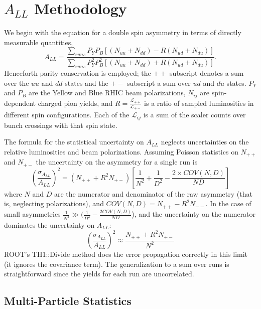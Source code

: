 \section{$A_{LL}$ Methodology}

We begin with the equation for a double spin asymmetry in terms of directly measurable quantities,
%
\begin{equation}
  A_{LL} = \frac{\sum_{runs} P_{Y}P_{B}\left[(N_{uu} + N_{dd}) - R(N_{ud} + N_{du})\right]}{\sum_{runs} P_{Y}^{2}P_{B}^{2}\left[(N_{uu} + N_{dd}) + R(N_{ud} + N_{du})\right]}.
  \label{eqn:all-basics}
\end{equation}
%
Henceforth parity conservation is employed; the \(++\) subscript denotes a sum
over the \(uu\) and \(dd\) states and the \(+-\) subscript a sum over \(ud\)
and \(du\) states. \(P_Y\) and \(P_B\) are the Yellow and Blue RHIC beam
polarizations, \(N_{ij}\) are spin-dependent charged pion yields, and \(R =
\frac{\mathcal{L}_{++}}{\mathcal{L}_{+-}}\) is a ratio of sampled luminosities
in different spin configurations. Each of the $\mathcal{L}_{ij}$ is a sum of
the scaler counts over bunch crossings with that spin state.

The formula for the statistical uncertainty on \(A_{LL}\) neglects
uncertainties on the relative luminosities and beam polarizations. Assuming
Poisson statistics on \(N_{++}\) and \(N_{+-}\) the uncertainty on the
asymmetry for a single run is
%
\begin{equation}
  \left(\frac{\sigma_{A_{LL}}}{A_{LL}}\right)^2 = \left(N_{++} + R^2 N_{+-}\right)\left[\frac{1}{N^2} + \frac{1}{D^2} - \frac{2 \times COV(N,D)}{ND} \right]
\end{equation}
%
where \(N\) and \(D\) are the numerator and denominator of the raw asymmetry
(that is, neglecting polarizations), and \(COV(N,D) = N_{++} - R^2 N_{+-}\).
In the case of small asymmetries \(\frac{1}{N^2} \gg (\frac{1}{D^2} - \frac{2
COV(N,D)}{ND}\)), and the uncertainty on the numerator dominates the uncertainty
on \(A_{LL}\):
%
\begin{equation}
  \left(\frac{\sigma_{A_{LL}}}{A_{LL}}\right)^2 \approx \frac{N_{++} + R^2 N_{+-}}{N^2}
\end{equation}
%
ROOT's TH1::Divide method does the error propagation correctly in this limit
(it ignores the covariance term). The generalization to a sum over runs is
straightforward since the yields for each run are uncorrelated.

\subsection{Multi-Particle Statistics}

